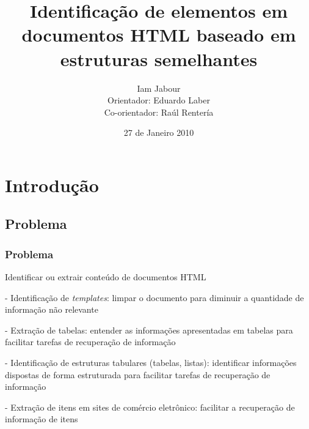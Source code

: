\documentclass{beamer}
\title{Identificação de elementos em documentos HTML baseado em estruturas semelhantes}
\author[Iam Jabour]{Iam Jabour \\ Orientador: Eduardo Laber \\ Co-orientador: Raúl Rentería}
\institute[PUC-Rio]{
  Pontifícia Universidade Católica do Rio de Janeiro \\
}
\date{27 de Janeiro 2010}
\newenvironment{my_itemize}{
\begin{itemize}
  \setlength{\itemsep}{5pt}
  \setlength{\parskip}{2pt}
  \setlength{\parsep}{3pt}
}{\end{itemize}}
\begin{document}
\begin{frame}
  \titlepage
\end{frame}



\section{Introdução}
\begin{frame}
  \subsection{Problema}
  \frametitle{Problema}
  \begin{my_itemize}
    \item Identificar ou extrair conteúdo de documentos HTML
    \begin{my_itemize}
    \item[-] Identificação de \textit{templates}: limpar o documento para diminuir a quantidade de informação não relevante 

    \item[-] \alert{Extração de tabelas: entender as informações apresentadas em tabelas para facilitar tarefas de recuperação de informação }

    \item[-] Identificação de estruturas tabulares (tabelas, listas): identificar informações dispostas de forma estruturada para facilitar tarefas de recuperação de informação 

    \item[-] \alert{Extração de itens em sites de comércio eletrônico: facilitar a recuperação de informação de itens}
    \end{my_itemize}

  \end{my_itemize}
\end{frame}
\end{document}
